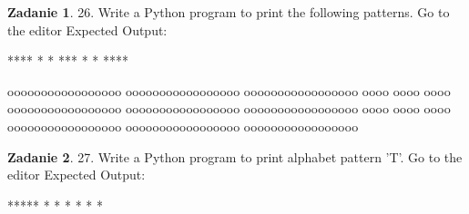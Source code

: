 \documentclass[11pt]{article}
\theoremstyle{definition}
\newtheorem{zadanie}{Zadanie}
\begin{document}
\begin{zadanie}


26. Write a Python program to print the following patterns. Go to the editor
Expected Output:

  ****                                                                  
 *                                                                      
 *                                                                      
  ***                                                                   
     *                                                                  
     *                                                                  
 **** 
 
 ooooooooooooooooo                                                       
ooooooooooooooooo                                                       
ooooooooooooooooo                                                       
oooo                                                                    
oooo                                                                    
oooo                                                                    
ooooooooooooooooo                                                       
ooooooooooooooooo                                                       
ooooooooooooooooo                                                       
             oooo                                                       
             oooo                                                       
             oooo                                                       
ooooooooooooooooo                                                       
ooooooooooooooooo                                                       
ooooooooooooooooo 



\end{zadanie}

\begin{zadanie}

27. Write a Python program to print alphabet pattern 'T'. Go to the editor
Expected Output:

 *****                                                                  
   *                                                                    
   *                                                                    
   *                                                                    
   *                                                                    
   *                                                                    
   *  



\end{zadanie}
\end{document}
